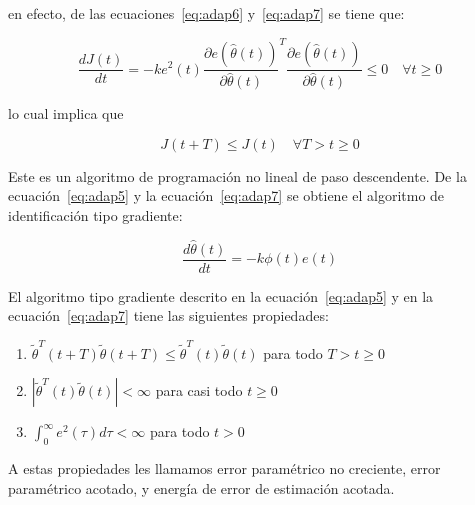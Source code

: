             en efecto, de las ecuaciones~\ref{eq:adap6} y~\ref{eq:adap7} se tiene que:

            \begin{equation*}
                \frac{d J(t)}{dt} = -k e^2(t) \frac{\partial e(\hat{\theta}(t))}{\partial \hat{\theta}(t)}^T \frac{\partial e(\hat{\theta}(t))}{\partial \hat{\theta}(t)} \le 0 \quad \forall t \ge 0
            \end{equation*}

            lo cual implica que

            \begin{equation}
                J(t + T) \le J(t) \quad \forall T > t \ge 0
            \end{equation}

            Este es un algoritmo de programación no lineal de paso descendente.
            De la ecuación~\ref{eq:adap5} y la ecuación~\ref{eq:adap7} se obtiene el algoritmo de identificación tipo gradiente:

            \begin{equation} \label{eq:adap7}
                \frac{d \hat{\theta}(t)}{dt} = -k \phi(t) e(t)
            \end{equation}


            \begin{lema}
                El algoritmo tipo gradiente descrito en la ecuación~\ref{eq:adap5} y en la ecuación~\ref{eq:adap7} tiene las siguientes propiedades:

                \begin{enumerate}
                    \item $\tilde{\theta}^T(t + T) \tilde{\theta}(t + T) \le \tilde{\theta}^T(t) \tilde{\theta}(t)$ para todo $T > t \ge 0$
                    \item $\left| \tilde{\theta}^T(t) \tilde{\theta}(t) \right| < \infty$ para casi todo $t \ge 0$
                    \item $\int_0^{\infty} e^2(\tau) d\tau < \infty$ para todo $t > 0$
                \end{enumerate}

                A estas propiedades les llamamos error paramétrico no creciente, error paramétrico acotado, y energía de error de estimación acotada.
            \end{lema}

